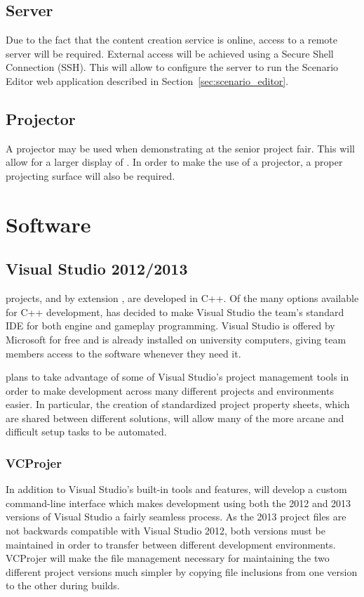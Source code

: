 \documentclass{GlobalDocument}
\begin{document}
\subsection{Server}
Due to the fact that the content creation service is online, access to a remote server will be required. External access will be achieved using a Secure Shell Connection (SSH). This will allow \ourteam{} to configure the server to run the Scenario Editor web application described in Section~\ref{sec:scenario_editor}.

\subsection{Projector}
A projector may be used when demonstrating \ourgame{} at the senior project fair. This will allow for a larger display of \ourgame{}. In order to make the use of a projector, a proper projecting surface will also be required.

\section{Software}
\subsection{Visual Studio 2012/2013}
\ourengine{} projects, and by extension \ourgame{}, are developed in C++. Of the many options available for C++ development, \ourteam{} has decided to make Visual Studio the team's standard IDE for both engine and gameplay programming. Visual Studio is offered by Microsoft for free and is already installed on university computers, giving team members access to the software whenever they need it.

\ourteam{} plans to take advantage of some of Visual Studio's project management tools in order to make development across many different projects and environments easier. In particular, the creation of standardized project property sheets, which are shared between different solutions, will allow many of the more arcane and difficult setup tasks to be automated.

\subsubsection{VCProjer}
In addition to Visual Studio's built-in tools and features, \ourteam{} will develop a custom command-line interface which makes development using both the 2012 and 2013 versions of Visual Studio a fairly seamless process. As the 2013 project files are not backwards compatible with Visual Studio 2012, both versions must be maintained in order to transfer between different development environments. VCProjer will make the file management necessary for maintaining the two different project versions much simpler by copying file inclusions from one version to the other during builds.
\end{document}
